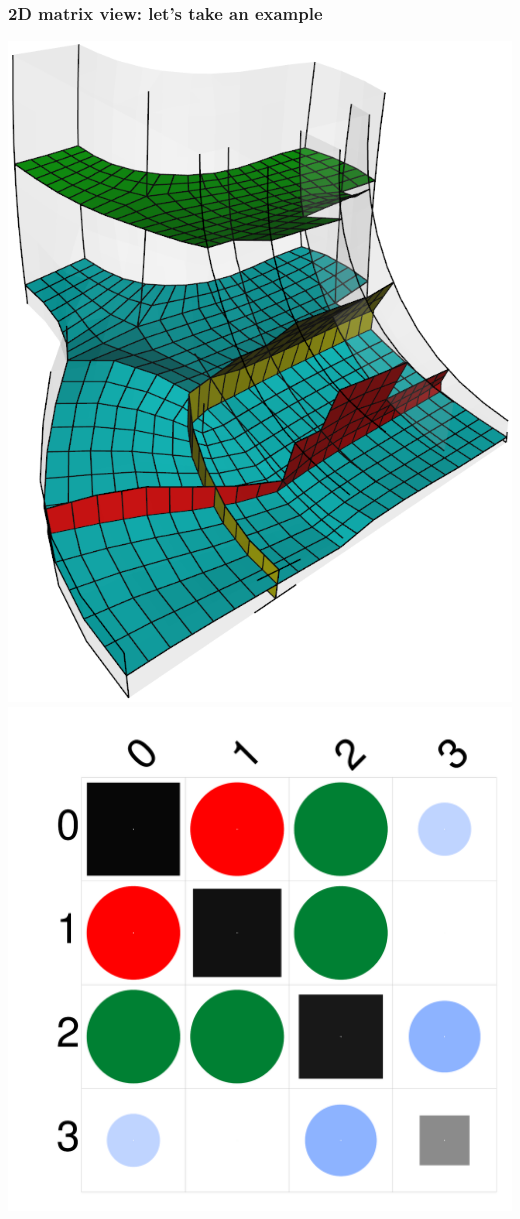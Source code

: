 \documentclass[12pt]{beamer}
\begin{document}
\begin{frame}[fragile]
  \frametitle{2D matrix view: let's take an example}
  \begin{center}
  \includegraphics[height=0.9\textheight]{./images/vis-2d-ex2-sheets.png}
  \includegraphics[height=0.5\textheight]{./images/vis-2d-ex2-matrix.png}
  \end{center}
\end{frame}
\end{document}
